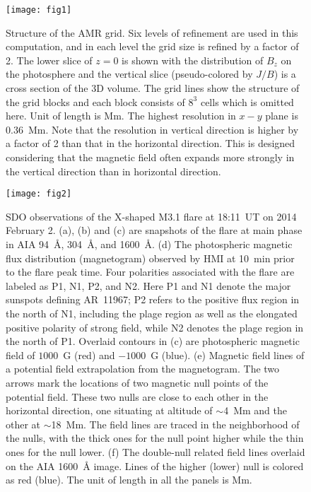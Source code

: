 \documentclass[twocolumn]{aastex6} %
\begin{document}
\begin{CJK*}{UTF8}{gbsn}

\begin{figure}[htbp]
  \centering
  \texttt{[image: fig1]}
  \caption{Structure of the AMR grid. Six levels of refinement are used
    in this computation, and in each level the grid size is refined by
    a factor of 2. The lower slice of $z=0$ is shown with the
    distribution of $B_{z}$ on the photosphere and the vertical slice
    (pseudo-colored by $J/B$) is a cross section of the 3D volume. The
    grid lines show the structure of the grid blocks and each block
    consists of $8^{3}$ cells which is omitted here. Unit of length is
    Mm. The highest resolution in $x-y$ plane is 0.36~Mm.
    Note that the resolution in vertical direction is higher by a
    factor of 2 than that in the horizontal direction. This is
    designed considering that the magnetic field often expands more
    strongly in the vertical direction than in horizontal direction.}
  \label{fig:amr_mesh}
\end{figure}
\begin{figure*}[htbp]
  \centering
  \texttt{[image: fig2]}
  \caption{SDO observations of the X-shaped M3.1 flare at
    18:11~UT on 2014 February 2. (a), (b) and (c) are snapshots of the
    flare at main phase in AIA 94~{\AA}, 304~{\AA}, and 1600~{\AA}. (d)
    The photospheric magnetic flux distribution (magnetogram) observed
    by HMI at 10~min prior to the flare peak time. Four polarities
    associated with the flare are labeled as P1, N1, P2, and N2. Here
    P1 and N1 denote the major sunspots defining AR~11967; P2 refers
    to the positive flux region in the north of N1, including the
    plage region as well as the elongated positive polarity of strong
    field, while N2 denotes the plage region in the north of P1.
    Overlaid contours in (c) are photospheric magnetic field of
    $1000$~G (red) and $-1000$~G (blue). (e) Magnetic field lines of a
    potential field extrapolation from the magnetogram. The two arrows
    mark the locations of two magnetic null points of the potential
    field. These two nulls are close to each other in the horizontal
    direction, one situating at altitude of $\sim$4~Mm and the other
    at $\sim$18~Mm. The field lines are traced in the neighborhood of
    the nulls, with the thick ones for the null point higher while the
    thin ones for the null lower. (f) The double-null related field
    lines overlaid on the AIA 1600~{\AA} image. Lines of the higher
    (lower) null is colored as red (blue). The unit of length in all
    the panels is Mm.}
  \label{fig:4aia_hmi}
\end{figure*}



\end{CJK*}
\end{document}
